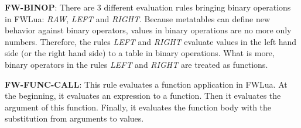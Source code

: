 {\bf FW-BINOP}: There are 3 different evaluation rules bringing binary operations in FWLua: {\it RAW}, {\it LEFT} and {\it RIGHT}. Because metatables can define new behavior against binary operators, values in binary operations are no more only numbers. Therefore, the rules {\it LEFT} and {\it RIGHT} evaluate values in the left hand side (or the right hand side) to a table in binary operations. What is more, binary operators in the rules {\it LEFT} and {\it RIGHT} are treated as functions.

{\bf FW-FUNC-CALL}: This rule evaluates a function application in FWLua. At the beginning, it evaluates an expression to a function. Then it evaluates the argument of this function.  Finally, it evaluates the function body with the substitution from arguments to values. 


